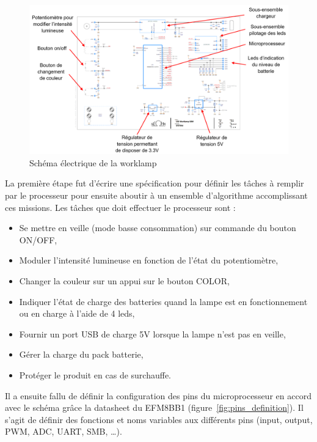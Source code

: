 \documentclass[a4paper, 11pt]{report}
\begin{document}
\begin{figure}[!h]
\begin{center}
\includegraphics[scale=0.55]{figures/screenshots/version_A3_worklamp.png}
\end{center}
\caption{Schéma électrique de la worklamp}
\label{fig:worklamp_schema}
\end{figure}

La première étape fut d’écrire une spécification pour définir les tâches à remplir par le processeur pour ensuite aboutir à un ensemble d’algorithme accomplissant ces missions.
Les tâches que doit effectuer le processeur sont :
\begin{itemize} %
\item Se mettre en veille (mode basse consommation) sur commande du bouton ON/OFF,
\item Moduler l’intensité lumineuse en fonction de l’état du potentiomètre,
\item Changer la couleur sur un appui sur le bouton COLOR,
\item Indiquer l’état de charge des batteries quand la lampe est en fonctionnement ou en charge à l’aide de 4 leds,
\item Fournir un port USB de charge 5V lorsque la lampe n’est pas en veille,
\item Gérer la charge du pack batterie,
\item Protéger le produit en cas de surchauffe.
\end{itemize}


Il a ensuite fallu de définir la configuration des pins du microprocesseur en accord avec le schéma grâce la datasheet du EFM8BB1 (figure~\ref{fig:pins_definition}). Il s’agit de définir des fonctions et noms variables aux différents pins (input, output, PWM, ADC, UART, SMB, …).
\end{document}
